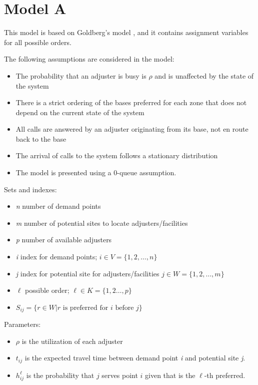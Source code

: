 
\section{Model A}

This model is based on Goldberg's model \cite{goldberg1990validating},
and it contains assignment variables
for all possible orders.

The following assumptions are considered in the model:
\begin{itemize}
\item The probability that an adjuster is busy
  is $\rho$ and is unaffected by the state of the system
\item There is a strict ordering of the bases preferred for each zone
  that does not depend
  on the current state of the system
\item All calls are answered
  by an adjuster originating from its base,
  not en route back to the base
\item The arrival of calls to the system
  follows a stationary distribution
\item The model is presented
  using a 0-queue assumption.
\end{itemize}

Sets and indexes:
\begin{itemize}
\item \textit{n} number of demand points
\item \textit{m} number of potential sites to locate adjusters/facilities
\item \textit{p} number of available adjusters
\item \textit{i} index for demand points;
  $i \in V = \{1,2,\ldots,n\}$ 
\item \textit{j} index for potential site for adjusters/facilities
  $j \in W = \{1,2,\ldots,m\}$
\item $\ell$ possible order;
  $\ell \in K = \{1,2\ldots,p\}$
\item $S_{ij} = \{
  r \in W | r \mbox{ is preferred for } i \mbox{ before } j
  \}$
\end{itemize}

Parameters:
\begin{itemize}
\item $\rho$ is the utilization of each adjuster
\item $t_{ij}$ is the expected travel time
  between demand point \textit{i}
  and potential site \textit{j}.
\item $h_{ij}^{\ell}$ is the probability
  that $j$ serves point $i$
  given that
  is the $\ell$-th preferred.
\end{itemize}

